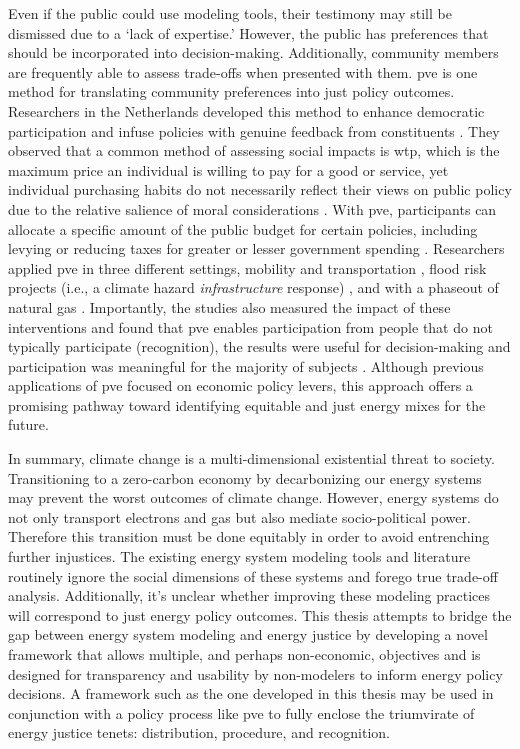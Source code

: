 Even if the public could use modeling tools, their testimony may still be
dismissed due to a `lack of expertise.' However, the public has preferences that
should be incorporated into decision-making. Additionally, community members are
frequently able to assess trade-offs when presented with them. \Acf{pve} is one
method for translating community preferences into just policy outcomes.
Researchers in the Netherlands developed this method to enhance democratic
participation and infuse policies with genuine feedback from constituents
\cite{mouter_introduction_2019}. They observed that a common method of assessing
social impacts is \ac{wtp}, which is the maximum price an individual is willing
to pay for a good or service, yet individual purchasing habits do not
necessarily reflect their views on public policy due to the relative salience of
moral considerations \cite{mouter_introduction_2019}. With \ac{pve},
participants can allocate a specific amount of the public budget for certain
policies, including levying or reducing taxes for greater or lesser government
spending \cite{mouter_introduction_2019}. Researchers applied \ac{pve} in three
different settings, mobility and transportation \cite{mouter_contrasting_2021},
flood risk projects (i.e., a climate hazard \textit{infrastructure} response)
\cite{dekker_economics_2019}, and with a phaseout of natural gas
\cite{mouter_including_2021}. Importantly, the studies also measured the impact
of these interventions and found that \ac{pve} enables participation from people
that do not typically participate (recognition), the results were useful for
decision-making and participation was meaningful for the majority of subjects
\cite{mouter_including_2021}. Although previous applications of \ac{pve} focused
on economic policy levers, this approach offers a promising pathway toward
identifying equitable and just energy mixes for the future.

In summary, climate change is a multi-dimensional existential threat to society.
Transitioning to a zero-carbon economy by decarbonizing our energy systems may
prevent the worst outcomes of climate change. However, energy systems do not
only transport electrons and gas but also mediate socio-political power.
Therefore this transition must be done equitably in order to avoid entrenching
further injustices. The existing energy system modeling tools and literature
routinely ignore the social dimensions of these systems and forego true
trade-off analysis. Additionally, it's unclear whether improving these modeling
practices will correspond to just energy policy outcomes. This thesis attempts
to bridge the gap between energy system modeling and energy justice by
developing a novel framework that allows multiple, and perhaps non-economic,
objectives and is designed for transparency and usability by non-modelers to
inform energy policy decisions. A framework such as the one developed in this
thesis may be used in conjunction with a policy process like \ac{pve} to fully
enclose the triumvirate of energy justice tenets: distribution, procedure, and
recognition.
